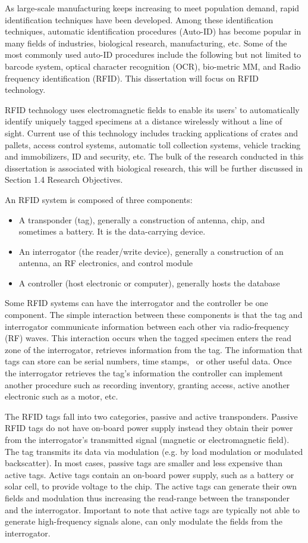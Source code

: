 As large-scale manufacturing keeps increasing to meet population demand, rapid identification techniques have been developed. Among these identification techniques, automatic identification procedures (Auto-ID) has become popular in many fields of industries, biological research, manufacturing, etc. Some of the most commonly used auto-ID procedures include the following but not limited to barcode system, optical character recognition (OCR), bio-metric MM, and Radio frequency identification (RFID). This dissertation will focus on RFID technology.   

RFID technology uses electromagnetic fields to enable its users' to automatically identify uniquely tagged specimens at a distance wirelessly without a line of sight. Current use of this technology includes tracking applications of crates and pallets, access control systems, automatic toll collection systems, vehicle tracking and immobilizers, ID and security, etc. The bulk of the research conducted in this dissertation is associated with biological research, this will be further discussed in Section 1.4 Research Objectives. 

\newpage
An RFID system is composed of three components:
\begin{itemize}
    \item A transponder (tag), generally a construction of antenna, chip, and sometimes a battery. It is the data-carrying device.
    \item An interrogator (the reader/write device), generally a construction of an antenna, an RF electronics, and control module
    \item A controller (host electronic or computer), generally hosts the database 
\end{itemize}

Some RFID systems can have the interrogator and the controller be one component. The simple interaction between these components is that the tag and interrogator communicate information between each other via radio-frequency (RF) waves. This interaction occurs when the tagged specimen enters the read zone of the interrogator, retrieves information from the tag. The information that tags can store can be serial numbers, time stamps,  or other useful data. Once the interrogator retrieves the tag's information the controller can implement another procedure such as recording inventory, granting access, active another electronic such as a motor, etc. 

The RFID tags fall into two categories, passive and active transponders. Passive RFID tags do not have on-board power supply instead they obtain their power from the interrogator's transmitted signal (magnetic or
electromagnetic field). The tag transmits its data via modulation (e.g. by load modulation or modulated backscatter). In most cases, passive tags are smaller and less expensive than active tags. Active tags contain an on-board power supply, such as a battery or solar cell, to provide voltage to the chip. The active tags can generate their own fields and modulation thus increasing the read-range between the transponder and the interrogator. Important to note that active tags are typically not able to generate high-frequency signals alone, can only modulate the fields from the interrogator.    

